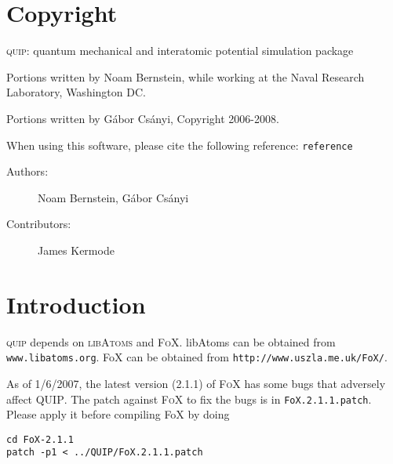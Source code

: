 \section{Copyright}

\textsc{quip}: quantum mechanical and interatomic potential simulation package

Portions written by Noam Bernstein, while working at the
Naval Research Laboratory, Washington DC. 

Portions written by G\'abor Cs\'anyi, Copyright 2006-2008.

When using this software,  please cite the following reference:
\texttt{reference}

\begin{description}
\item[Authors:] Noam Bernstein, G\'abor Cs\'anyi
\item[Contributors:] James Kermode
\end{description}

\section{Introduction}

\textsc{quip} depends on \textsc{libAtoms} and \textsc{FoX}.
libAtoms can be obtained from \texttt{www.libatoms.org}.
FoX can be obtained from \texttt{http://www.uszla.me.uk/FoX/}.

As of 1/6/2007, the latest version (2.1.1) of \textsc{FoX} has some
bugs that adversely affect \textsc{QUIP}.  The patch against
\textsc{FoX} to fix the bugs is in \texttt{FoX.2.1.1.patch}.  Please
apply it before compiling FoX by doing 

\begin{verbatim}
cd FoX-2.1.1
patch -p1 < ../QUIP/FoX.2.1.1.patch
\end{verbatim}


